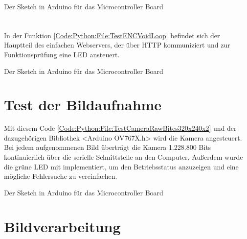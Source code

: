 \begin{code}[H]
        
    \caption[Sketch  ]{Der Sketch   in Arduino für das Microcontroller Board}
    \label{Code:Python:File:TestENCVoidSetup}    
\end{code} 

\section{}

In der Funktion  \ref{Code:Python:File:TestENCVoidLoop} befindet sich der Hauptteil des einfachen Webservers, der über HTTP kommuniziert und zur Funktionsprüfung eine LED ansteuert.

\begin{code}
        
    \caption[Sketch  ]{Der Sketch   in Arduino für das Microcontroller Board}
    \label{Code:Python:File:TestENCVoidLoop}    
\end{code} 




\section{Test der Bildaufnahme} 
Mit diesem Code \ref{Code:Python:File:TestCameraRawBites320x240x2} und der dazugehörigen Bibliothek <Arduino OV767X.h> wird die Kamera angesteuert. Bei jedem aufgenommenen Bild überträgt die Kamera 1.228.800 Bits kontinuierlich über die serielle Schnittstelle an den Computer. Außerdem wurde die grüne LED mit implementiert, um den Betriebsstatus anzuzeigen und eine mögliche Fehlersuche zu vereinfachen.
\begin{code}
    
    \caption[Sketch ]{Der Sketch  in Arduino für das Microcontroller Board}
    \label{Code:Python:File:TestCameraRawBites320x240x2}   
\end{code}

\section{Bildverarbeitung} 

